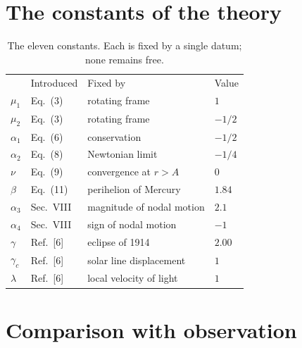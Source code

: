 \documentclass[aps,prd,reprint,amsmath,amssymb,nofootinbib,longbibliography]{revtex4-2}
\begin{document}
\section{The constants of the theory}

\begin{table}[t]
\caption{The eleven constants. Each is fixed by a single datum; none remains free.}
\label{tab:const}
\begin{ruledtabular}
\begin{tabular}{llll}
 & Introduced & Fixed by & Value \\
\colrule
$\mu_1$      & Eq.~(3) & rotating frame & $1$ \\
$\mu_2$      & Eq.~(3) & rotating frame & $-1/2$ \\
$\alpha_1$   & Eq.~(6) & conservation & $-1/2$ \\
$\alpha_2$   & Eq.~(8) & Newtonian limit & $-1/4$ \\
$\nu$        & Eq.~(9) & convergence at $r>A$ & $0$ \\
$\beta$      & Eq.~(11)& perihelion of Mercury & $1.84$ \\
$\alpha_3$   & Sec.~VIII & magnitude of nodal motion & $2.1$ \\
$\alpha_4$   & Sec.~VIII & sign of nodal motion & $-1$ \\
$\gamma$     & Ref.~[6] & eclipse of 1914 & $2.00$ \\
$\gamma_c$   & Ref.~[6] & solar line displacement & $1$ \\
$\lambda$    & Ref.~[6] & local velocity of light & $1$ \\
\end{tabular}
\end{ruledtabular}
\end{table}

\section{Comparison with observation}
\end{document}
